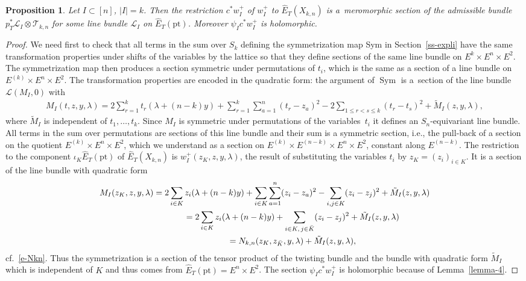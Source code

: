 \documentclass[10pt,a4paper]{amsart}
\numberwithin{equation}{section}
\newtheorem{Proposition}[Theorem]{Proposition}
 { \theoremstyle{definition}
\newtheorem{Definition}[Theorem]{Definition}
\newtheorem{Example}[Theorem]{Example}
\newtheorem{Remark}[Theorem]{Remark} }
\begin{document}
\begin{Proposition}\label{prop-8} Let $I\subset[n]$, $|I|=k$. Then the restriction $c ^*w^+_I$ of $w^+_I$ to $\hat E_T(X_{k,n})$ is a~meromorphic section of the admissible bundle $p_T^*\mathcal L_I\otimes \mathcal T_{k,n}$ for some line bundle $\mathcal L_I$ on $\hat E_T(\mathrm{pt})$. Moreover $\psi_Ic ^*w^+_I$ is holomorphic.
\end{Proposition}
\begin{proof} We need first to check that all terms in the sum over $S_k$ defining the symmetrization map Sym in Section~\ref{ss-expli} have the same transformation properties under shifts of the variables by the lattice so that they define sections of the same line bundle on $E^k\times E^n\times E^2$. The symmetrization map then produces a section symmetric under permutations of $t_i$, which is the same as a section of a line bundle on
 $E^{(k)}\times E^n\times E^2$. The transformation properties are encoded in the quadratic form: the argument of $\operatorname{Sym}$ is a~section of the line bundle $\mathcal L(M_I,0)$ with
 \begin{gather*}
 M_I(t,z,y,\lambda) =2\sum_{r=1}^k t_r(\lambda+(n-k)y)+\!\sum_{r=1}^k\sum_{a=1}^n (t_r-z_a)^2-2\!\!\!\sum_{1\leq r<s\leq k}\!\!(t_r-t_s)^2 + \tilde M_I(z,y,\lambda),
 \end{gather*}
where $\tilde M_I$ is independent of $t_1,\dots,t_k$. Since $M_I$ is symmetric under permutations of the variables~$t_i$ it defines an $S_n$-equivariant line bundle. All terms in the sum over permutations are sections of this line bundle and their sum is a symmetric section, i.e., the pull-back of a section on the quotient $E^{(k)}\times E^n\times E^2$, which we understand as a section on $E^{(k)}\times E^{(n-k)}\times E^n\times E^2$, constant along $E^{(n-k)}$. The restriction to the component $\iota_K\hat E_T(\mathrm{pt})$ of $\hat E_T(X_{k,n})$ is $w^+_I(z_K,z,y,\lambda)$, the result of substituting the variables $t_i$ by $z_K=(z_i)_{i\in K}$. It is a section of the line bundle with quadratic form
 \begin{gather*}
 M_I(z_K,z,y,\lambda) = 2\sum_{i\in K}z_i(\lambda+(n-k)y) +\sum_{i\in K}\sum_{a=1}^n(z_i-z_a)^2 -\sum_{i,j\in K}(z_i-z_j)^2+\tilde M_I(z,y,\lambda)\\
\hphantom{M_I(z_K,z,y,\lambda)}{} =2\sum_{i\in K}z_i(\lambda+(n-k)y) +\sum_{i\in K,\, j\in\bar K}(z_i-z_j)^2 +\tilde M_I(z,y,\lambda)\\
\hphantom{M_I(z_K,z,y,\lambda)}{}= N_{k,n}(z_K,z_{\bar K},y,\lambda)+\tilde M_I(z,y,\lambda),
 \end{gather*}
 cf.~\eqref{e-Nkn}. Thus the symmetrization is a section of the tensor product of the twisting bundle and the bundle with quadratic form $\tilde M_I$ which is independent of $K$ and thus comes from $\hat E_T(\mathrm{pt})=E^n\times E^2$. The section $\psi_Ic ^*w^+_I$ is holomorphic because of Lemma~\ref{lemma-4}.
\end{proof}
\end{document}
